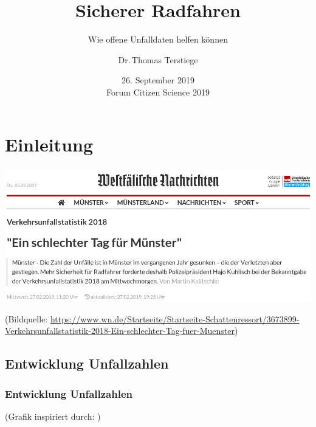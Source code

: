 \documentclass{beamer}
\title{Sicherer Radfahren}
\subtitle{Wie offene Unfalldaten helfen können}
\author[Dr.\,Thomas Terstiege]{Dr.\,Thomas Terstiege}
\institute[Code for Münster]{Code for Münster}
\date{26. September 2019\\{\scriptsize{}Forum Citizen Science 2019 }}%
\begin{document}

\section*{Einleitung}

\begin{frame}
  \frametitle{}
  \framesubtitle{}  
  
  \includegraphics[width=\textwidth]{img/WN-screenshot.png}
  
  \vfill
  {\scriptsize (Bildquelle: \url{https://www.wn.de/Startseite/Startseite-Schattenressort/3673899-Verkehrsunfallstatistik-2018-Ein-schlechter-Tag-fuer-Muenster})\par}
\end{frame}

\subsection{Entwicklung Unfallzahlen}

\begin{frame}
  \frametitle{Entwicklung Unfallzahlen}

  \centering
  
  \resizebox{\linewidth}{!}{
    
    }
  
    {\scriptsize (Grafik inspiriert durch: \citealt[Folie~4]{Brockmann2017})\par}
\end{frame}
\end{document}
